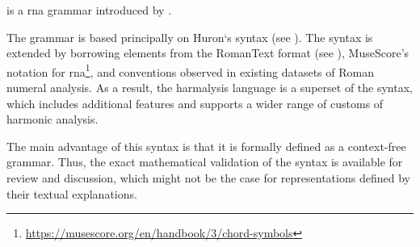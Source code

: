 

 is a \gls{rna} grammar introduced by
\textcite{napoleslopez2020harmalysis}.

The  grammar is based principally on
Huron‘s  syntax (see
). The syntax is extended by
borrowing elements from the RomanText format (see
), MuseScore's notation for
\gls{rna}\footnote{\href{https://musescore.org/en/handbook/3/chord-symbols\#rna}{https://musescore.org/en/handbook/3/chord-symbols}},
and conventions observed in existing datasets of Roman
numeral analysis.  As  a result,  the harmalysis language is
a superset  of  the  syntax,  which includes
additional features and supports a wider range of customs of
harmonic analysis.

The main advantage of this syntax is that it is formally
defined as a context-free grammar. Thus, the exact
mathematical validation of the syntax is available for
review and discussion, which might not be the case for
representations defined by their textual explanations.
